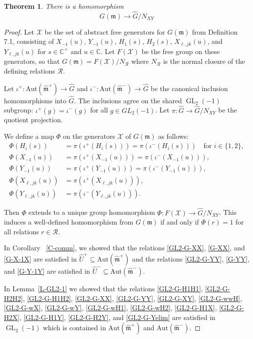 \documentclass[11pt,letterpaper]{amsart}
\newcounter{thecounter}
\numberwithin{thecounter}{section}
\newtheorem{theorem}[thecounter]{Theorem}
\theoremstyle{definition}
\DeclareMathOperator{\GL}{GL}
\begin{document}
\begin{theorem}\label{homom}
There is a homomorphism 
$$G(\mathfrak m)\to \widehat{G}/N_{XY}$$
\end{theorem}
\begin{proof} 
Let $\mathcal{X}$ be the set of abstract free generators for $G(\mathfrak{m})$ from Definition 7.1, consisting of $X_{-1}(u)$, $Y_{-1}(u)$, $H_1(s)$, $H_2(s)$, $X_{\ell,jk}(u)$, and $Y_{\ell,jk}(u)$ for $s \in \mathbb{C}^\times$ and $u \in \mathbb{C}$. Let $F(\mathcal{X})$ be the free group on these generators, so that $G(\mathfrak{m}) = F(\mathcal{X})/N_{\mathcal{R}}$ where $N_{\mathcal{R}}$ is the normal closure of the defining relations $\mathcal{R}$.

Let $\iota^+ \colon \text{Aut}(\widehat{\mathfrak{m}}^+) \to \widehat{G}$ and $\iota^- \colon \text{Aut}(\widehat{\mathfrak{m}}^-) \to \widehat{G}$ be the canonical inclusion homomorphisms into $\widehat{G}$. The inclusions agree on the shared $\GL_2(-1)$ subgroup: $\iota^+(g) = \iota^-(g)$ for all $g \in GL_2(-1)$. Let $\pi \colon \widehat{G} \to \widehat{G}/N_{XY}$ be the  quotient projection.

We define a map $\Phi$ on the generators $\mathcal{X}$ of $G(\mathfrak m)$ as follows:
\begin{align*}
\Phi(H_i(s)) &= \pi(\iota^+(H_i(s))) = \pi(\iota^-(H_i(s))) \quad \text{for } i \in \{1,2\},\\
\Phi(X_{-1}(u)) &= \pi(\iota^+(X_{-1}(u))) = \pi(\iota^-(X_{-1}(u))),\\
\Phi(Y_{-1}(u)) &= \pi(\iota^+(Y_{-1}(u))) = \pi(\iota^-(Y_{-1}(u))),\\
\Phi(X_{\ell,jk}(u)) &= \pi(\iota^+(X_{\ell,jk}(u))),\\
\Phi(Y_{\ell,jk}(u)) &= \pi(\iota^-(Y_{\ell,jk}(u))).
\end{align*}

Then $\Phi$ extends to a unique group homomorphism $\Phi \colon F(\mathcal{X}) \to \widehat{G}/N_{XY}$. This induces a well-defined homomorphism from $G(\mathfrak{m})$ if and only if $\Phi(r) = 1$ for all relations $r \in \mathcal{R}$. 


In Corollary ~\ref{C-comm}, we showed that the relations 
 \eqref{GL2-G-XX}, \eqref{G-XX}, and \eqref{G-X-1X}
are satisfied in $\widehat{U}^+\subseteq \text{Aut}(\widehat{\mathfrak{m}}^+)$ and the relations \eqref{GL2-G-YY}, \eqref{G-YY}, and \eqref{G-Y-1Y} are satisfied in $\widehat{U}^-\subseteq \text{Aut}(\widehat{\mathfrak{m}}^-)$.

In Lemma~\ref{L-GL2-1}  we showed that the relations \eqref{GL2-G-H1H1}, \eqref{GL2-G-H2H2}, \eqref{GL2-G-H1H2}, \eqref{GL2-G-XX}, 
\eqref{GL2-G-YY}, \eqref{GL2-G-XY}, \eqref{GL2-G-wwH}, \eqref{GL2-G-wX}, \eqref{GL2-G-wY}, \eqref{GL2-G-wH1},  
\eqref{GL2-G-wH2}, \eqref{GL2-G-H1X}, \eqref{GL2-G-H2X}, \eqref{GL2-G-H1Y}, \eqref{GL2-G-H2Y}, and \eqref{GL2-G-Yelim}  are satisfied in  $\GL_2({-1})$ which is contained in $\text{Aut}(\widehat{\mathfrak{m}}^+)$ and $\text{Aut}(\widehat{\mathfrak{m}}^-)$.


\end{proof}
\end{document}
